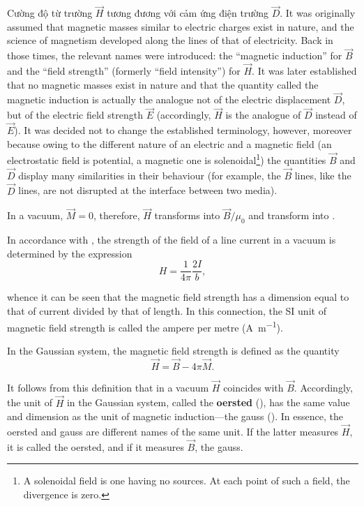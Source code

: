 Cường độ từ trường $\vec{H}$ tương đương với cảm ứng điện trường $\vec{D}$.
It was originally assumed that magnetic masses similar to electric charges exist in nature, and the science of magnetism developed along the lines of that of electricity.
Back in those times, the relevant names were introduced: the ``magnetic induction'' for $\vec{B}$ and the ``field strength'' (formerly ``field intensity'') for $\vec{H}$.
It was later established that no magnetic masses exist in nature and that the quantity called the magnetic induction is actually the analogue not of the electric displacement $\vec{D}$, but of the electric field strength $\vec{E}$ (accordingly, $\vec{H}$ is the analogue of $\vec{D}$ instead of $\vec{E}$).
It was decided not to change the established terminology, however, moreover because owing to the different nature of an electric and a magnetic field (an electrostatic field is potential, a magnetic one is solenoidal\footnote{A solenoidal field is one having no sources. At each point of such a field,
the divergence is zero.}) the quantities $\vec{B}$ and $\vec{D}$ display many similarities in their behaviour (for example, the $\vec{B}$ lines, like the $\vec{D}$ lines, are not disrupted at the interface between two media).

In a vacuum, $\vec{M}=0$, therefore, $\vec{H}$ transforms into $\vec{B}/\mu_0$ and  transform into .

In accordance with , the strength of the field of a line current in a vacuum is determined by the expression
\begin{equation}\label{eq:7_12}
    H = \frac{1}{4\pi}\frac{2I}{b},
\end{equation}

\noindent
whence it can be seen that the magnetic field strength has a dimension equal to that of current divided by that of length.
In this connection, the SI unit of magnetic field strength is called the ampere per metre (\si{\ampere\per\metre}).

In the Gaussian system, the magnetic field strength is defined as the quantity
\begin{equation}\label{eq:7_13}
    \vec{H} = \vec{B} - 4\pi \vec{M}.
\end{equation}

\noindent
It follows from this definition that in a vacuum $\vec{H}$ coincides with $\vec{B}$.
Accordingly, the unit of $\vec{H}$ in the Gaussian system, called the \textbf{oersted} (\si{\oersted}), has the same value and dimension as the unit of magnetic induction---the gauss (\si{\gauss}).
In essence, the oersted and gauss are different names of the same unit.
If the latter measures $\vec{H}$, it is called the oersted, and if it measures $\vec{B}$, the gauss.

